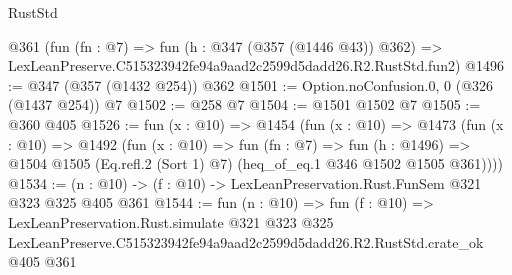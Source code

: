 \begin{lexlean}{RustStd}
\begin{coremodule}
    @361
    (fun (fn : @7) =>
    fun (h : @347 (@357 (@1446 @43)) @362) =>
    LexLeanPreserve.C515323942fe94a9aad2c2599d5dadd26.R2.RustStd.fun2)
@1496 := @347 (@357 (@1432 @254)) @362
@1501 := Option.noConfusion.{0, 0} (@326 (@1437 @254)) @7
@1502 := @258 @7
@1504 := @1501 @1502 @7
@1505 := @360 @405
@1526 := fun (x : @10) =>
  @1454
    (fun (x : @10) =>
    @1473
      (fun (x : @10) =>
      @1492
        (fun (x : @10) =>
        fun (fn : @7) =>
        fun (h : @1496) =>
        @1504 @1505 (Eq.refl.{2} (Sort 1) @7) (heq_of_eq.{1} @346 @1502 @1505 @361))))
@1534 := (n : @10) -> (f : @10) -> LexLeanPreservation.Rust.FunSem @321 @323 @325 @405 @361
@1544 := fun (n : @10) =>
  fun (f : @10) =>
  LexLeanPreservation.Rust.simulate
    @321
    @323
    @325
    LexLeanPreserve.C515323942fe94a9aad2c2599d5dadd26.R2.RustStd.crate_ok
    @405
    @361
\end{coremodule}
\end{lexlean}
